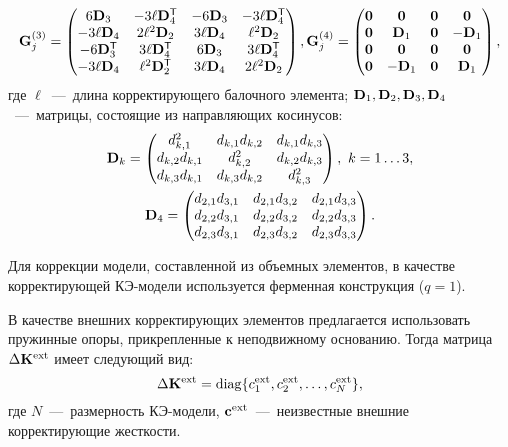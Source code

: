 \begin{equation*}
	\mathbf{G}_j^{(3)} =
	\begin{pmatrix}
		6 \mathbf{D}_3 & -3 \ell \mathbf{D} ^ \mathsf{T}_4 & -6 \mathbf{D}_3 & -3 \ell \mathbf{D} ^ \mathsf{T}_4 \\
		-3 \ell \mathbf{D}_4 & 2 \ell ^ 2 \mathbf{D}_2 & 3 \ell \mathbf{D}_4 & \ell ^ 2 \mathbf{D}_2 \\
		-6 \mathbf{D} ^ \mathsf{T}_3 & 3 \ell \mathbf{D} ^ \mathsf{T}_4 & 6 \mathbf{D}_3 & 3 \ell \mathbf{D} ^ \mathsf{T}_4 \\
		-3 \ell \mathbf{D}_4 & \ell ^ 2 \mathbf{D} ^ \mathsf{T}_2 & 3 \ell \mathbf{D}_4 & 2 \ell ^ 2 \mathbf{D}_2
	\end{pmatrix},
	\mathbf{G}_j^{(4)} =
	\begin{pmatrix}
		\mathbf{0} & \mathbf{0} & \mathbf{0} & \mathbf{0} \\
		\mathbf{0} & \mathbf{D}_1 & \mathbf{0} & -\mathbf{D}_1 \\
		\mathbf{0} & \mathbf{0} & \mathbf{0} & \mathbf{0} \\
		\mathbf{0} & -\mathbf{D}_1 & \mathbf{0} & \mathbf{D}_1 \\
	\end{pmatrix},
\end{equation*}
где $ \ell $~---~длина корректирующего балочного элемента; $ \mathbf{D}_1, \mathbf{D}_2, \mathbf{D}_3, \mathbf{D}_4 $~---~матрицы, состоящие из направляющих косинусов:
\begin{gather*}
	\mathbf{D}_k = 
	\begin{pmatrix}
		d_{k, 1}^2 & d_{k, 1} d_{k, 2} & d_{k, 1} d_{k, 3} \\
		d_{k, 2} d_{k, 1} & d_{k, 2} ^ 2 & d_{k, 2} d_{k, 3} \\
		d_{k, 3} d_{k, 1} & d_{k, 3} d_{k, 2} & d_{k, 3} ^ 2
	\end{pmatrix}, \ k = 1 \hdots 3, \\
	\mathbf{D}_4 = 
	\begin{pmatrix}
		d_{2, 1} d_{3, 1} & d_{2, 1} d_{3, 2} & d_{2, 1} d_{3, 3} \\
		d_{2, 2} d_{3, 1} & d_{2, 2} d_{3, 2} & d_{2, 2} d_{3, 3} \\
		d_{2, 3} d_{3, 1} & d_{2, 3} d_{3, 2} & d_{2, 3} d_{3, 3}
	\end{pmatrix}.
\end{gather*}

Для коррекции модели, составленной из объемных элементов, в качестве корректирующей КЭ-модели используется ферменная конструкция ($ q = 1 $). 

В качестве внешних корректирующих элементов предлагается использовать пружинные опоры, прикрепленные к неподвижному основанию. Тогда матрица $ \Delta \mathbf{K} ^ {\text{ext}} $ имеет следующий вид:
\begin{equation}
	\Delta \mathbf{K} ^ {\text{ext}} = \operatorname{diag} \{ c ^ {\text{ext}}_1, c ^ {\text{ext}}_2, \hdots, c ^ {\text{ext}}_N \},
\end{equation}
где $ N $~---~размерность КЭ-модели, $ \mathbf{c} ^ {\text{ext}} $~---~неизвестные внешние корректирующие жесткости. 

